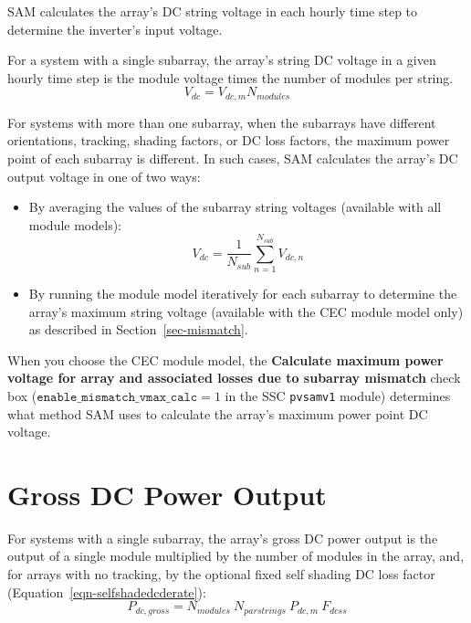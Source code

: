 \documentclass[12pt,letterpaper]{article}
\begin{document}
SAM calculates the array's DC string voltage in each hourly time step to determine the inverter's input voltage.

For a system with a single subarray, the array's string DC voltage in a given hourly time step is the module voltage times the number of modules per string.
\begin{equation}
V_{dc} = V_{dc,m} N_{modules}
\end{equation}

For systems with more than one subarray, when the subarrays have different orientations, tracking, shading factors, or DC loss factors, the maximum power point of each subarray is different. In such cases, SAM calculates the array's DC output voltage in one of two ways:
\begin{itemize}
\item By averaging the values of the subarray string voltages (available with all module models): 
\begin{equation}
V_{dc} =  \frac{1}{N_{sub}}\sum_{n=1}^{N_{sub}} V_{dc,n}
\end{equation}
\item By running the module model iteratively for each subarray to determine the array's maximum string voltage (available with the CEC module model only) as described in Section~\ref{sec-mismatch}.
\end{itemize}

When you choose the CEC module model, the \textbf{Calculate maximum power voltage for array and associated losses due to subarray mismatch} check box ($\mathtt{enable\_mismatch\_vmax\_calc}=1$ in the SSC \texttt{pvsamv1} module) determines what method SAM uses to calculate the array's maximum power point DC voltage.

\section{Gross DC Power Output}

For systems with a single subarray, the array's gross DC power output is the output of a single module multiplied by the number of modules in the array, and, for arrays with no tracking, by the optional fixed self shading DC loss factor (Equation~\ref{eqn-selfshadedcderate}):
\begin{equation}
P_{dc,gross} = N_{modules}~N_{parstrings}~P_{dc,m}~F_{dcss}
\end{equation}
\end{document}
